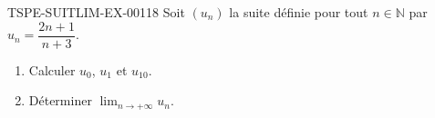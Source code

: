 \begin{exercice}{TSPE-SUITLIM-EX-001}{1}{8}
Soit $(u_n)$ la suite définie pour tout $n \in \mathbb{N}$ par $u_n = \dfrac{2n+1}{n+3}$.
\begin{enumerate}
  \item Calculer $u_0$, $u_1$ et $u_{10}$.
  \item Déterminer $\lim_{n \to +\infty} u_n$.
\end{enumerate}
\end{exercice}
